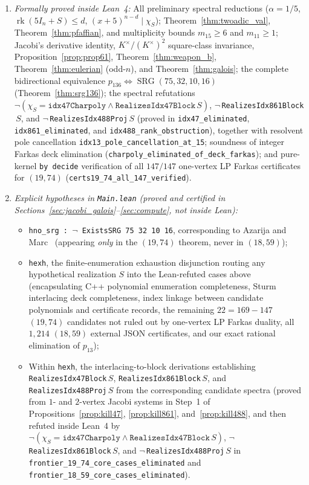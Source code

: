 \documentclass[11pt,reqno]{amsart}
\theoremstyle{definition}
\theoremstyle{remark}
\numberwithin{equation}{section}
\numberwithin{table}{section}
\DeclareMathOperator{\rk}{rk}
\DeclareMathOperator{\SRG}{SRG}
\begin{document}
\begin{enumerate}
  \item \emph{Formally proved inside Lean~4:} All preliminary spectral reductions ($\alpha = 1/5$, $\rk(5I_n+S) \le d$, $(x+5)^{n-d}\mid\chi_S$); Theorem~\ref{thm:twoadic_val}, Theorem~\ref{thm:pfaffian}, and multiplicity bounds $m_{15} \ge 6$ and $m_{11} \ge 1$; Jacobi's derivative identity, $K^\times/(K^\times)^2$ square-class invariance, Proposition~\ref{prop:prop61}, Theorem~\ref{thm:weapon_b}, Theorem~\ref{thm:eulerian} (odd-$n$), and Theorem~\ref{thm:galois}; the complete bidirectional equivalence $p_{136} \Leftrightarrow \SRG(75, 32, 10, 16)$ (Theorem~\ref{thm:srg136}); the spectral refutations $\neg(\chi_S = \texttt{idx47Charpoly} \wedge \texttt{RealizesIdx47Block}\,S)$, $\neg\,$\nolinkurl{RealizesIdx861Block}$\,S$, and $\neg\,$\nolinkurl{RealizesIdx488Proj}$\,S$ (proved in \nolinkurl{idx47_eliminated}, \nolinkurl{idx861_eliminated}, and \nolinkurl{idx488_rank_obstruction}), together with resolvent pole cancellation \nolinkurl{idx13_pole_cancellation_at_15}; soundness of integer Farkas deck elimination (\nolinkurl{charpoly_eliminated_of_deck_farkas}); and pure-kernel \texttt{by decide} verification of all $147/147$ one-vertex LP Farkas certificates for $(19, 74)$ (\nolinkurl{certs19_74_all_147_verified}).
  \item \emph{Explicit hypotheses in \nolinkurl{Main.lean} (proved and certified in Sections~\ref{sec:jacobi_galois}--\ref{sec:compute}, not inside Lean):}
  \begin{itemize}
    \item \texttt{hno\_srg : $\neg$\,ExistsSRG 75 32 10 16}, corresponding to Azarija and Marc~\cite{AzarijaMarc2018} (appearing \emph{only} in the $(19, 74)$ theorem, never in $(18, 59)$);
    \item \texttt{hexh}, the finite-enumeration exhaustion disjunction routing any hypothetical realization $S$ into the Lean-refuted cases above (encapsulating C++ polynomial enumeration completeness, Sturm interlacing deck completeness, index linkage between candidate polynomials and certificate records, the remaining $22 = 169 - 147$ $(19, 74)$ candidates not ruled out by one-vertex LP Farkas duality, all $1{,}214$ $(18, 59)$ external JSON certificates, and our exact rational elimination of $p_{13}$);
    \item Within \texttt{hexh}, the interlacing-to-block derivations establishing \nolinkurl{RealizesIdx47Block}\,$S$, \nolinkurl{RealizesIdx861Block}\,$S$, and \nolinkurl{RealizesIdx488Proj}\,$S$ from the corresponding candidate spectra (proved from $1$- and $2$-vertex Jacobi systems in Step~1 of Propositions~\ref{prop:kill47}, \ref{prop:kill861}, and~\ref{prop:kill488}, and then refuted inside Lean~4 by $\neg(\chi_S = \texttt{idx47Charpoly} \wedge \texttt{RealizesIdx47Block}\,S)$, $\neg\,$\nolinkurl{RealizesIdx861Block}$\,S$, and $\neg\,$\nolinkurl{RealizesIdx488Proj}$\,S$ in \nolinkurl{frontier_19_74_core_cases_eliminated} and \nolinkurl{frontier_18_59_core_cases_eliminated}).
  \end{itemize}
\end{enumerate}
\end{document}
